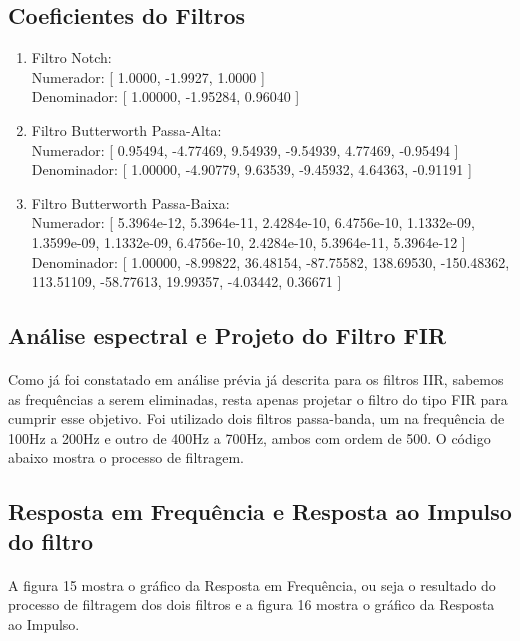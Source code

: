 \documentclass[12pt,fleqn]{article}
\begin{document}
\subsection{Coeficientes do Filtros}
\begin{enumerate}
    \item Filtro Notch:
    \\ Numerador: [  1.0000, -1.9927,  1.0000 ]
    \\ Denominador: [  1.00000, -1.95284,  0.96040 ]
    \item Filtro Butterworth Passa-Alta:
    \\ Numerador: [  0.95494, -4.77469,  9.54939, -9.54939,  4.77469, -0.95494 ]
    \\ Denominador: [  1.00000, -4.90779,  9.63539, -9.45932,  4.64363, -0.91191 ]
    \item Filtro Butterworth Passa-Baixa:
    \\ Numerador: [  5.3964e-12,  5.3964e-11,  2.4284e-10,  6.4756e-10,  1.1332e-09,  1.3599e-09,  1.1332e-09,  6.4756e-10,   2.4284e-10,  5.3964e-11,  5.3964e-12 ]
    \\ Denominador: [  1.00000,  -8.99822,  36.48154,  -87.75582,  138.69530, -150.48362,  113.51109,  -58.77613,  19.99357,  -4.03442,  0.36671 ]
\end{enumerate}

\subsection{Análise espectral e Projeto do Filtro FIR}
\paragraph{} Como já foi constatado em análise prévia já descrita para os filtros IIR, sabemos as frequências a serem eliminadas, resta apenas projetar o filtro do tipo FIR para cumprir esse objetivo. Foi utilizado dois filtros passa-banda, um na frequência de 100Hz a 200Hz e outro de 400Hz a 700Hz, ambos com ordem de 500. O código abaixo mostra o processo de filtragem.



\newpage

\subsection{Resposta em Frequência e Resposta ao Impulso do filtro}
\paragraph{} A figura 15 mostra o gráfico da Resposta em Frequência, ou seja o resultado do processo de filtragem dos dois filtros e a figura 16 mostra o gráfico da Resposta ao Impulso.
\end{document}
